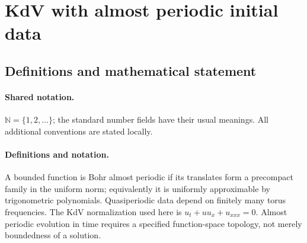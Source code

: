 \documentclass[11pt]{article}
\begin{document}
\section{KdV with almost periodic initial data}\label{statement}

\subsection{Definitions and mathematical statement}

\paragraph{Shared notation.}$\mathbb N=\{1,2,\ldots\}$; the standard number fields have their usual meanings. All additional conventions are stated locally.


\paragraph{Definitions and notation.}A bounded function is Bohr almost periodic if its translates form a precompact family in the uniform norm; equivalently it is uniformly approximable by trigonometric polynomials. Quasiperiodic data depend on finitely many torus frequencies. The KdV normalization used here is $u_t+uu_x+u_{xxx}=0$. Almost periodic evolution in time requires a specified function-space topology, not merely boundedness of a solution.
\end{document}
